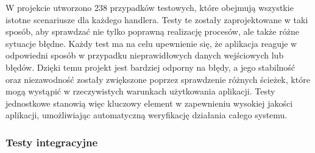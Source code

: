 \documentclass[12pt,a4paper]{article}
\begin{document}
\noindent
W projekcie utworzono 238 przypadków testowych, które obejmują wszystkie istotne scenariusze dla każdego handlera. Testy te zostały zaprojektowane w taki sposób, aby sprawdzać nie tylko poprawną realizację procesów, ale także różne sytuacje błędne. Każdy test ma na celu upewnienie się, że aplikacja reaguje w odpowiedni sposób w przypadku nieprawidłowych danych wejściowych lub błędów. Dzięki temu projekt jest bardziej odporny na błędy, a jego stabilność oraz niezawodność zostały zwiększone poprzez sprawdzenie różnych ścieżek, które mogą wystąpić w rzeczywistych warunkach użytkowania aplikacji. Testy jednostkowe stanowią więc kluczowy element w zapewnieniu wysokiej jakości aplikacji, umożliwiając automatyczną weryfikację działania całego systemu.

\newpage

\subsubsection{Testy integracyjne}
\end{document}
